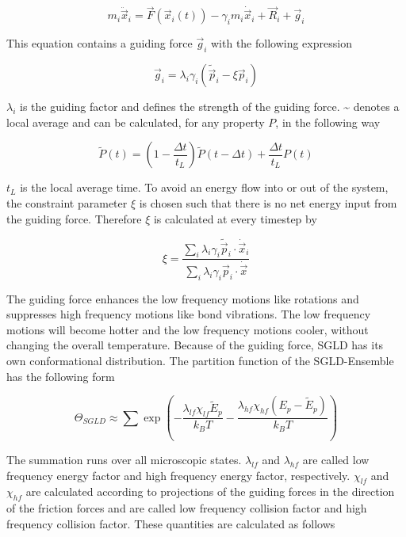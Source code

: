 \documentclass[a4paper]{article}
\begin{document}
\begin{equation}
m_i \ddot{\vec{x}}_i = \vec{F}(\vec{x}_i(t)) - \gamma_i m_i \dot{\vec{x}}_i + \vec{R}_i + \vec{g}_i
\label{eq:self_guided}
\end{equation}

This equation contains a guiding force $\vec{g}_i$ with the following expression

\begin{equation}
\vec{g}_i = \lambda_i \gamma_i (\tilde{\vec{p}}_i - \xi \vec{p}_i)
\label{eq:guiding_force}
\end{equation}

$\lambda_i$ is the guiding factor and defines the strength of the guiding force. \~{} denotes a local average and can be calculated, for any property $P$, in the following way

\begin{equation}
\tilde{P}(t) = \left( 1 - \frac{\Delta t}{t_L} \right) \tilde{P}(t - \Delta t) + \frac{\Delta t}{t_L} P(t)
\label{eq:local_average}
\end{equation}

$t_L$ is the local average time. To avoid an energy flow into or out of the system, the constraint parameter $\xi$ is chosen such that there is no net energy input from the guiding force. Therefore $\xi$ is calculated at every timestep by

\begin{equation}
\xi = \frac{\sum_i \lambda_i \gamma_i \tilde{\vec{p}}_i \cdot \dot{\vec{x}}_i}{\sum_i \lambda_i \gamma_i \vec{p}_i \cdot \dot{\vec{x}}}
\label{eq:constraint_parameter}
\end{equation}

The guiding force enhances the low frequency motions like rotations and suppresses high frequency motions like bond vibrations. The low frequency motions will become hotter and the low frequency motions cooler, without changing the overall temperature. Because of the guiding force, SGLD has its own conformational distribution. The partition function of the SGLD-Ensemble has the following form~\cite{XiongwuWu2011a} 

\begin{equation}
\Theta_{SGLD} \approx \sum \exp \left( - \frac{\lambda_{lf} \chi_{lf} \tilde{E}_p}{k_B T} - \frac{\lambda_{hf} \chi_{hf}(E_p - \tilde{E}_p)}{k_B T} \right)
\label{eq:partition_function_sgld}
\end{equation}

The summation runs over all microscopic states. $\lambda_{lf}$ and $\lambda_{hf}$ are called low frequency energy factor and high frequency energy factor, respectively. $\chi_{lf}$ and $\chi_{hf}$ are calculated according to projections of the guiding forces in the direction of the friction forces and are called low frequency collision factor and high frequency collision factor. These quantities are calculated as follows
\end{document}
